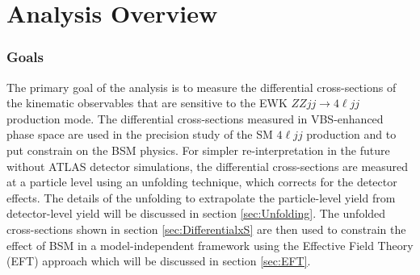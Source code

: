 \part {\LARGE{Analysis Overview}}
\label{sec:AnalysisOverview}

\section{Goals}
\label{sec:Analysis_Goals}

The primary goal of the analysis is to measure the differential cross-sections of the kinematic observables that are sensitive to the EWK $ZZjj \rightarrow 4\ell jj$ production mode. The differential cross-sections measured in VBS-enhanced phase space are used in the precision study of the SM $4\ell jj$ production and to put constrain on the BSM physics. For simpler re-interpretation in the future without ATLAS detector simulations, the differential cross-sections are measured at a particle level using an unfolding technique, which corrects for the detector effects. The details of the unfolding to extrapolate the particle-level yield from detector-level yield will be discussed in section \ref{sec:Unfolding}. The unfolded cross-sections shown in section \ref{sec:DifferentialxS} are then used to constrain the effect of BSM in a model-independent framework using the Effective Field Theory (EFT) approach which will be discussed in section \ref{sec:EFT}. 
  
